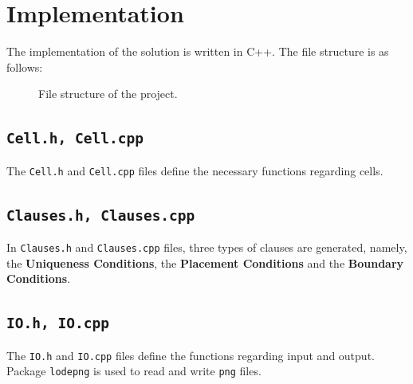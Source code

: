 \documentclass[12pt, a4paper]{article}
\theoremstyle{mystyle}
\begin{document}
    \section{Implementation}
        The implementation of the solution is written in \textsf{C++}. The file structure is as follows:
        \begin{figure}[H]
            \caption{File structure of the project.}
        \end{figure}
        \subsection{\texttt{Cell.h, Cell.cpp}}
        The \texttt{Cell.h} and \texttt{Cell.cpp} files define the necessary functions regarding cells.
        \subsection{\texttt{Clauses.h, Clauses.cpp}}
        In \texttt{Clauses.h} and \texttt{Clauses.cpp} files, three types of clauses are generated, namely, the \textbf{Uniqueness Conditions}, the \textbf{Placement Conditions} and the \textbf{Boundary Conditions}.
        \subsection{\texttt{IO.h, IO.cpp}}
        The \texttt{IO.h} and \texttt{IO.cpp} files define the functions regarding input and output. Package \texttt{lodepng} is used to read and write \texttt{png} files.
\end{document}
